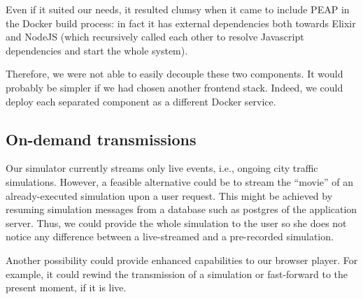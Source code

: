 Even if it suited our needs, it resulted clumsy when it came to include PEAP
in the Docker build process: in fact it has external dependencies both towards
Elixir and NodeJS (which recursively called each other to resolve
Javascript dependencies and start the whole system).

Therefore, we were not able to easily decouple these two components.
It would probably be simpler if we had chosen another
frontend stack. Indeed, we could 
deploy each separated component as a different Docker service.

\subsection{On-demand transmissions}
Our simulator currently streams only live events, i.e., ongoing city traffic
simulations. However, a feasible alternative could be to stream the ``movie''
of an already-executed simulation upon a user request.
This might be achieved by resuming simulation messages from a database such as
postgres of the application server. Thus, we could provide the
whole simulation to the user so she does not notice any difference between
a live-streamed and a pre-recorded simulation.

Another possibility could provide enhanced capabilities to our browser
player. For example, it could rewind the transmission of a simulation or
fast-forward to the present moment, if it is live.
